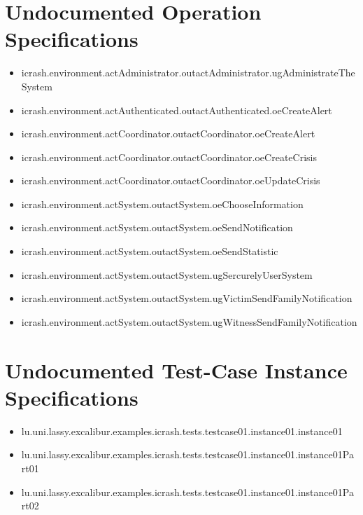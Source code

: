 \section[Undocumented Operation Specifications]{Undocumented Operation Specifications}
\begin{itemize}
\item icrash.environment.actAdministrator.outactAdministrator.ugAdministrateTheSystem 
\item icrash.environment.actAuthenticated.outactAuthenticated.oeCreateAlert 
\item icrash.environment.actCoordinator.outactCoordinator.oeCreateAlert 
\item icrash.environment.actCoordinator.outactCoordinator.oeCreateCrisis 
\item icrash.environment.actCoordinator.outactCoordinator.oeUpdateCrisis 
\item icrash.environment.actSystem.outactSystem.oeChooseInformation 
\item icrash.environment.actSystem.outactSystem.oeSendNotification 
\item icrash.environment.actSystem.outactSystem.oeSendStatistic 
\item icrash.environment.actSystem.outactSystem.ugSercurelyUserSystem 
\item icrash.environment.actSystem.outactSystem.ugVictimSendFamilyNotification 
\item icrash.environment.actSystem.outactSystem.ugWitnessSendFamilyNotification 
\end{itemize}





\section[Undocumented Test-Case Instance Specifications]{Undocumented Test-Case Instance Specifications}
\begin{itemize}
\item lu.uni.lassy.excalibur.examples.icrash.tests.testcase01.instance01.instance01 
\item lu.uni.lassy.excalibur.examples.icrash.tests.testcase01.instance01.instance01Part01 
\item lu.uni.lassy.excalibur.examples.icrash.tests.testcase01.instance01.instance01Part02 
\end{itemize}



